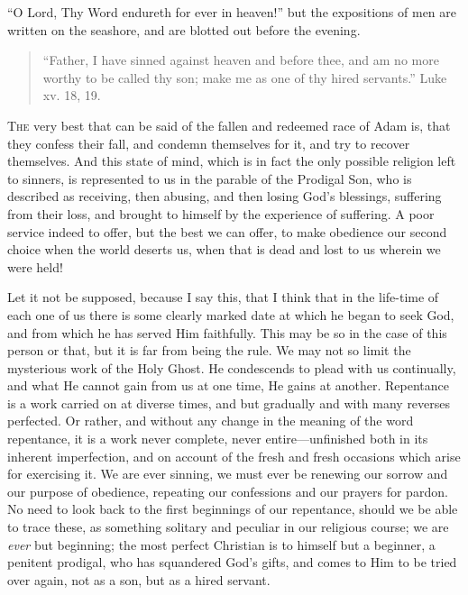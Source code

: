 ``O Lord, Thy Word endureth for ever in heaven!'' but the
expositions of men are written on the seashore, and are blotted out
before the evening.


\begin{quote}

``Father, I have sinned against heaven and before thee, and
am no more worthy to be called thy son; make me as one of thy hired
servants.'' Luke xv. 18, 19.

\end{quote}

T\textsc{he} very best that can be said of the fallen and redeemed race of
Adam is, that they confess their fall, and condemn themselves for it,
and try to recover themselves. And this state of mind, which is in
fact the only possible religion left to sinners, is represented to us
in the parable of the Prodigal Son, who is described as receiving,
then abusing, and then losing God's blessings, suffering from their
loss, and brought to himself by the experience of suffering. A poor
service indeed to offer, but the best we can offer, to make obedience
our second choice when the world deserts us, when that is dead and
lost to us wherein we were held!

Let it not be supposed, because I say this, that I think that in
the life-time of each one of us there is some clearly marked date at
which he began to seek God, and from which he has served Him
faithfully. This may be so in the case of this person or that, but
it is far from being the rule. We may not so limit the mysterious work of
the Holy Ghost. He condescends to plead with us
continually, and what He cannot gain from us at one time, He gains at
another. Repentance is a work carried on at diverse times, and but
gradually and with many reverses perfected. Or rather, and without any
change in the meaning of the word repentance, it is a work never
complete, never entire—unfinished both in its inherent imperfection,
and on account of the fresh and fresh occasions which arise for
exercising it. We are ever sinning, we must ever be renewing our
sorrow and our purpose of obedience, repeating our confessions and our
prayers for pardon. No need to look back to the first beginnings of
our repentance, should we be able to trace these, as something
solitary and peculiar in our religious course; we are \emph{ever} but
beginning; the most perfect Christian is to himself but a beginner, a
penitent prodigal, who has squandered God's gifts, and comes to Him to
be tried over again, not as a son, but as a hired servant.

